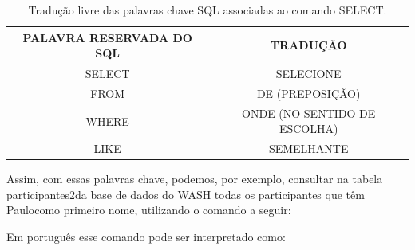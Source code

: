 \documentclass[
12pt,		%
openright,	%
twoside,  %
a4paper,			%
chapter=TITLE,		%
english,			%
french,				%
spanish,			%
brazil				%
]{USPSC-classe/USPSC}
\begin{document}
\begin{table}[htb]
\tiny
\caption{\label{0faf6421bd5dff6b3cb8bedd3f0b4212f1150970}Tradu\c{c}\~ao livre das palavras chave SQL associadas ao comando SELECT.}

\centering
\begin{tabular}{|c|c|}
\hline
PALAVRA RESERVADA DO SQL  &  TRADU\c{C}\~AO \\
\hline
SELECT  &  SELECIONE \\
FROM  &  DE (PREPOSI\c{C}\~AO) \\
WHERE  &  ONDE (NO SENTIDO DE ESCOLHA) \\
LIKE  &  SEMELHANTE \\
\hline
\end{tabular}
\end{table}


Assim, com essas palavras chave, podemos, por exemplo, consultar na tabela \textquotedbl participantes2\textquotedbl  da base de dados do WASH todas os participantes que t\^em \textquotedbl Paulo\textquotedbl  como primeiro nome, utilizando o comando a seguir:


















\noindent\begin{center}\mbox{\centering{}}\end{center}


Em portugu\^es esse comando pode ser interpretado como:


















\noindent\begin{center}\mbox{\centering{}}\end{center}
\end{document}
